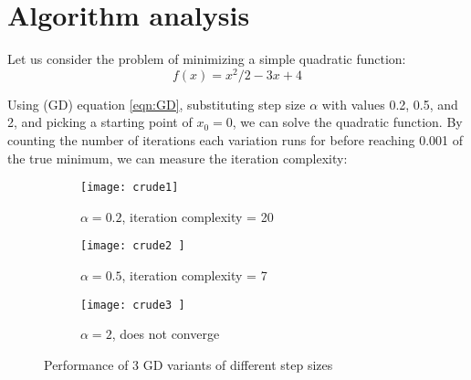 \section{Algorithm analysis}
Let us consider the problem of minimizing a simple quadratic function:
\begin{equation} \label{eqn:quadratic}
    f(x) = x^2/2 - 3x + 4
\end{equation}

Using (GD) equation \ref{eqn:GD}, substituting step size $\alpha$ with values 0.2, 0.5, and 2, and picking a starting point of $x_0 = 0$, we can solve the quadratic function. By counting the number of iterations each variation runs for before reaching 0.001 of the true minimum, we can measure the iteration complexity:

\begin{figure}[htp]
  \centering
  \begin{subfigure}{.5\textwidth}
    \centering
    \texttt{[image: crude1]}
    \caption{$\alpha = 0.2$, iteration complexity = 20}
    \label{fig:crude1}
  \end{subfigure}%
  \begin{subfigure}{.5\textwidth}
    \centering
    \texttt{[image: crude2 ]}
    \caption{$\alpha = 0.5$, iteration complexity = 7}
    \label{fig:crude2}
  \end{subfigure}
  \begin{subfigure}{.5\textwidth}
    \centering
    \texttt{[image: crude3 ]}
    \caption{$\alpha = 2$, does not converge}
    \label{fig:crude3}
  \end{subfigure}
  \caption{Performance of 3 GD variants of different step sizes}
\label{fig:test}
\end{figure}


